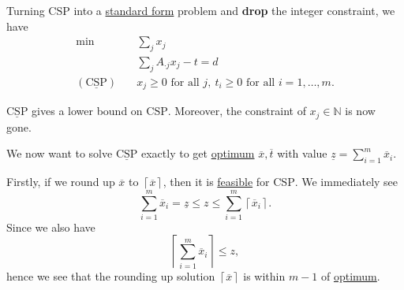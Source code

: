 \begin{answer}
	Turning \(\mathrm{CSP}\) into a \hyperref[def:standard-form]{standard form} problem and \textbf{drop} the integer constraint, we have
	\[
		\begin{aligned}
			\min~                           & \sum\limits_{j} x_{j}                                                        \\
			                                & \sum\limits_{j} A_{\cdot j}x_{j} - t = d                                     \\
			(\mathrm{\underline{CSP}})\quad & x_{j}\geq 0 \text{ for all }j,\ t_{i}\geq 0\text{ for all }i = 1, \dots , m.
		\end{aligned}
	\]

	\begin{note}
		\(\mathrm{\underline{CSP}}\) gives a lower bound on \(\mathrm{CSP}\). Moreover, the constraint of \(x_{j}\in\mathbb{N}\)
		is now gone.
	\end{note}

	We now want to solve \(\mathrm{\underline{CSP}}\) exactly to get \hyperref[def:optimal-solution]{optimum} \(\overline{x}, \overline{t}\) with value \(\underline{z} = \sum\limits_{i=1}^{m} \overline{x}_{i}\).

	Firstly, if we round up \(\overline{x}\) to \(\left\lceil \overline{x} \right\rceil \), then it is \hyperref[def:feasible-solution]{feasible} for \(\mathrm{CSP}\). We immediately see
	\[
		\sum\limits_{i=1}^{m} \overline{x}_{i} = \underline{z} \leq z \leq \sum\limits_{i=1}^{m} \left\lceil \overline{x}_{i} \right\rceil.
	\]
	Since we also have
	\[
		\left\lceil \sum\limits_{i=1}^{m} \overline{x}_{i} \right\rceil \leq z,
	\]
	hence we see that the rounding up solution \(\left\lceil \overline{x} \right\rceil \) is within \(m-1\) of \hyperref[def:optimal-solution]{optimum}.


\end{answer}

